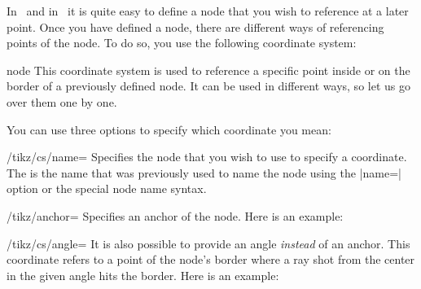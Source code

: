 In \pgfname\ and in \tikzname\ it is quite easy to define a node that you wish
to reference at a later point. Once you have defined a node, there are
different ways of referencing points of the node. To do so, you use the
following coordinate system:

\begin{coordinatesystem}{node}
    This coordinate system is used to reference a specific point inside or on
    the border of a previously defined node. It can be used in different ways,
    so let us go over them one by one.

    You can use three options to specify which coordinate you mean:
    \begin{key}{/tikz/cs/name=}
        Specifies the node that you wish to use to specify a coordinate. The
         is the name that was previously used to name the node
        using the |name=| option or the special node name
        syntax.
    \end{key}
    \begin{key}{/tikz/anchor=}
        Specifies an anchor of the node. Here is an example:
\begin{codeexample}[preamble={\usetikzlibrary{arrows.meta}}]
\end{codeexample}
    \end{key}
    \begin{key}{/tikz/cs/angle=}
        It is also possible to provide an angle \emph{instead} of an anchor.
        This coordinate refers to a point of the node's border where a ray shot
        from the center in the given angle hits the border. Here is an example:
\begin{codeexample}[preamble={\usetikzlibrary{shapes.geometric}}]
\end{codeexample}
    \end{key}


\end{coordinatesystem}
